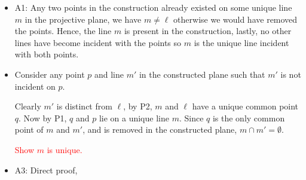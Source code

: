 \documentclass[a4paper, 11pt]{article}
\begin{document}
\begin{itemize}
	\item
		 A1: Any two points in the construction already existed on some unique line $m$ in the projective plane, we have $m\neq\ell$ otherwise we would have removed the points. Hence, the line $m$ is present in the construction, lastly, no other lines have become incident with the points so $m$ is the unique line incident with both points.  



	\item 
		Consider any point $p$ and line $m'$ in the constructed plane such that $m'$ is not incident on $p$. 

		Clearly $m'$ is distinct from $\ell$, by P2, $m$ and $\ell$ have a unique common point $q$. Now by P1, $q$ and $p$ lie on a unique line $m$. Since $q$ is the only common point of $m$ and $m'$, and is removed in the constructed plane, $m\cap m'=\emptyset$. 


		\textcolor{red}{Show $m$ is unique.}

		\begin{center}
		\end{center}




		
	\item 
		A3: Direct proof, 
\end{itemize}
\end{document}
